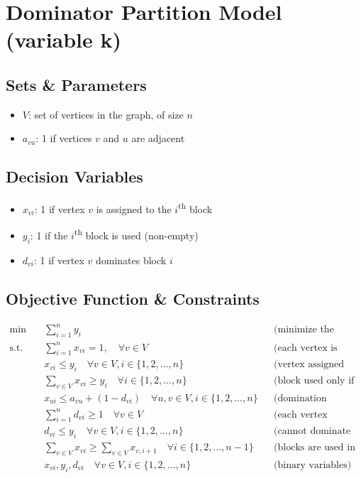 \section{Dominator Partition Model (variable k)}
\label{sec:dominator_partition_variable_k}


\subsection*{Sets \& Parameters}
\begin{itemize}[label=, noitemsep]
    \item $V$: set of vertices in the graph, of size $n$
    \item $a_{vu}$: 1 if vertices $v$ and $u$ are adjacent
\end{itemize}

\subsection*{Decision Variables}
\begin{itemize}[label=, noitemsep]
    \item $x_{vi}$: 1 if vertex $v$ is assigned to the $i$\textsuperscript{th} block
    \item $y_{i}$: 1 if the $i$\textsuperscript{th} block is used (non-empty)
    \item $d_{vi}$: 1 if vertex $v$ dominates block $i$
\end{itemize}

\subsection*{Objective Function \& Constraints}
\begin{align*}
    \min \quad &\sum_{i=1}^{n} y_i &&\text{(minimize the number of blocks used)}\\
    \text{s.t.} \quad
    &\sum_{i=1}^{n} x_{vi} = 1, \quad \forall v \in V &&\text{(each vertex is assigned to one block)}\\
    &x_{vi} \leq y_i \quad \forall v \in V, i \in \{1, 2, \dots, n\} &&\text{(vertex assigned only if block used)}\\
    & \sum_{v \in V} x_{vi} \geq y_i \quad \forall i \in \{1, 2, \dots, n\} &&\text{(block used only if it is not empty)}\\
    &x_{ui} \leq a_{vu} + (1 - d_{vi}) \quad \forall u,v \in V, i \in \{1, 2, \dots, n\} &&\text{(domination condition)}\\
    &\sum_{i=1}^{n} d_{vi} \geq 1 \quad \forall v \in V &&\text{(each vertex dominates at least one block)}\\
    & d_{vi} \leq y_i \quad \forall v \in V, i \in \{1, 2, \dots, n\} &&\text{(cannot dominate an empty block)}\\
    & \sum_{v \in V} x_{vi} \geq \sum_{v \in V} x_{v,i+1} \quad \forall i \in \{1, 2, \dots, n-1\} &&\text{(blocks are used in order)}\\
    &x_{vi}, y_i, d_{vi} \quad \forall v \in V, i \in \{1, 2, \dots, n\} &&\text{(binary variables)}\\
\end{align*}
